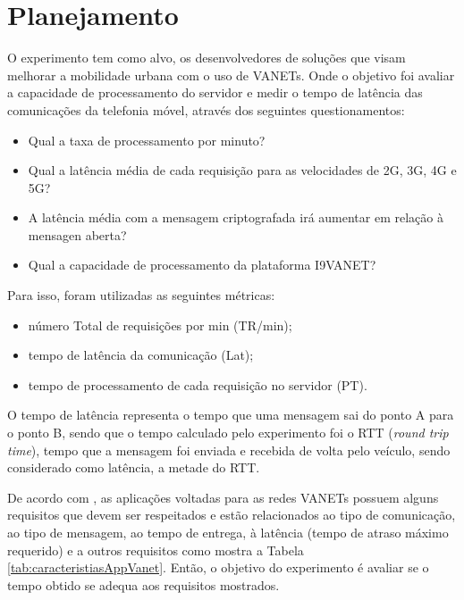 \documentclass[
	12pt,				%
	oneside,			%
	a4paper,			%
	english,			%
	brazil				%
	]{abntex2ppgsi}
\begin{document}
\section{Planejamento}
O experimento tem como alvo, os desenvolvedores de soluções que visam melhorar a mobilidade urbana com o uso de VANETs. Onde o objetivo foi avaliar a capacidade de processamento do servidor e medir o tempo de latência das comunicações da telefonia móvel, através dos seguintes questionamentos:
\begin{itemize}
	\item {Qual a taxa de processamento por minuto?}
	\item {Qual a latência média de cada requisição para as velocidades de 2G, 3G, 4G e 5G?}
	\item {A latência média com a mensagem criptografada irá aumentar em relação à mensagen aberta?}
	\item {Qual a capacidade de processamento da plataforma I9VANET?}
\end{itemize} 

Para isso, foram utilizadas as seguintes métricas: 
\begin{itemize}
	\item {número Total de requisições por min (TR/min);}
	\item {tempo de latência da comunicação (Lat);}
	\item {tempo de processamento de cada requisição no servidor (PT).}
\end{itemize} 

O tempo de latência representa o tempo que uma mensagem sai do ponto A para o ponto B, sendo que o tempo calculado pelo experimento foi o RTT (\textit{round trip time}), tempo que a mensagem foi enviada e recebida de volta pelo veículo, sendo considerado como latência, a metade do RTT.

De acordo com ,  as aplicações voltadas para as redes VANETs possuem alguns requisitos que devem ser respeitados e estão relacionados ao tipo de comunicação, ao tipo de mensagem, ao tempo de entrega, à latência (tempo de atraso máximo requerido)  e a outros requisitos como mostra a Tabela \ref{tab:caracteristiasAppVanet}. Então, o objetivo do experimento é avaliar se o tempo obtido se adequa aos requisitos mostrados.
\end{document}
